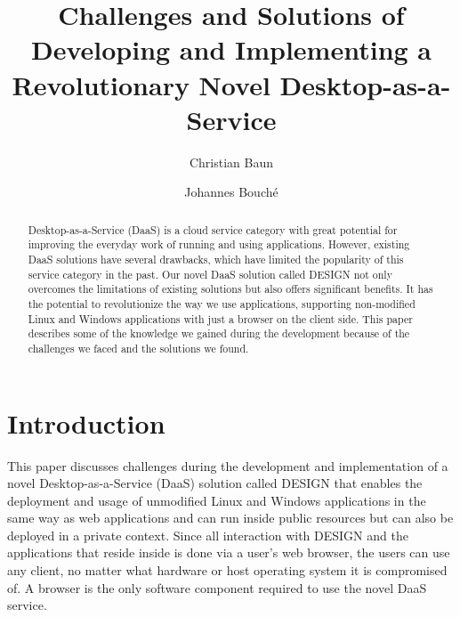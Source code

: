 \documentclass[runningheads]{llncs}
\begin{document}
%
\title{Challenges and Solutions of Developing and
	Implementing a Revolutionary Novel Desktop-as-a-Service}
%
%
\author{Christian Baun \and 
Johannes Bouché}
%
%
%
\maketitle              %
%
\begin{abstract}
Desktop-as-a-Service (DaaS) is a cloud service category with great potential for improving the everyday work of running and using applications. However, existing DaaS solutions have several drawbacks, which have limited the popularity of this service category in the past. Our novel DaaS solution called DESIGN not only overcomes the limitations of existing solutions but also offers significant benefits. It has the potential to revolutionize the way we use applications, supporting non-modified Linux and Windows applications with just a browser on the client side. This paper describes some of the knowledge we gained during the development because of the challenges we faced and the solutions we found. 

\end{abstract}
%
%
%
\section{Introduction}


This paper discusses challenges during the development and implementation of a novel Desktop-as-a-Service (DaaS) solution called DESIGN that enables the deployment and usage of unmodified Linux and Windows applications in the same way as web applications and can run inside public resources but can also be deployed in a private context. Since all interaction with DESIGN and the applications that reside inside is done via a user's web browser, the users can use any client, no matter what hardware or host operating system it is compromised of. A browser is the only software component required to use the novel DaaS service.
\end{document}
